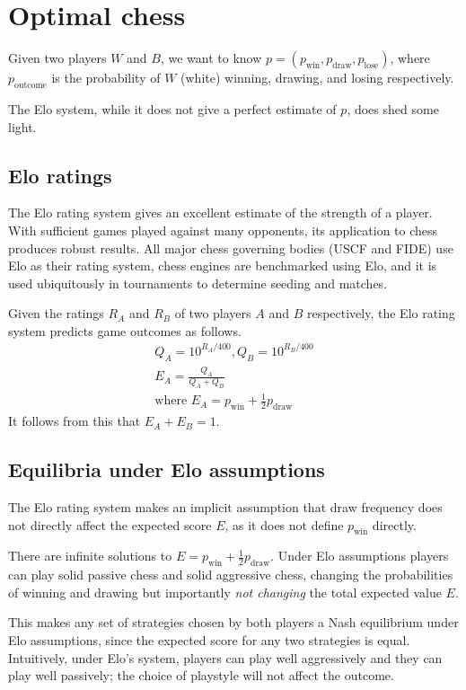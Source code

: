 \documentclass{article}
\begin{document}
\section{Optimal chess}

Given two players $W$ and $B$, we want to know
$p=(p_{\text{win}}, p_{\text{draw}}, p_{\text{lose}})$, where $p_{\text{outcome}}$ is
the probability of $W$ (white) winning, drawing, and losing respectively.

The Elo system, while it does not give a perfect estimate of $p$, does shed some light.

\subsection{Elo ratings}
The Elo rating system gives an excellent estimate of the strength of a player.
With sufficient games played against many opponents, its application to chess produces robust results. All major chess governing bodies (USCF and FIDE) use Elo as their rating system,
chess engines are benchmarked using Elo, and it is used ubiquitously in tournaments to determine seeding and matches.

Given the ratings $R_A$ and $R_B$ of two players $A$ and $B$ respectively, the Elo rating system predicts game outcomes as follows.
\begin{gather*}
    Q_A = 10^{R_A/400}, Q_B = 10^{R_B/400} \\
    E_A = \frac{Q_A}{Q_A+Q_B} \\
    \text{where } E_A = p_{\text{win}} + \frac{1}{2} p_{\text{draw}}
\end{gather*}
It follows from this that $E_A+E_B=1$.

\subsection{Equilibria under Elo assumptions}

The Elo rating system makes an implicit assumption that draw frequency does not directly affect
the expected score $E$, as it does not define $p_{\text{win}}$ directly.

There are infinite solutions to $E = p_{\text{win}} + \frac{1}{2} p_{\text{draw}}$.
Under Elo assumptions players can play solid passive chess and solid aggressive chess,
changing the probabilities of winning and drawing but importantly \textit{not changing}
the total expected value $E$.

This makes any set of strategies chosen by both players a Nash equilibrium under Elo assumptions, since the expected score for any two strategies is equal.
Intuitively, under Elo's system, players can play well
aggressively and they can play well passively; the choice of playstyle will not affect the outcome.
\end{document}
